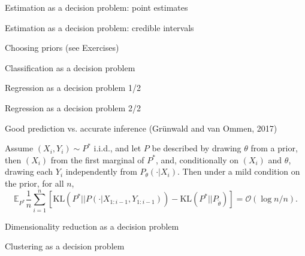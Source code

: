 \documentclass[10pt]{beamer}
\begin{document}
\begin{frame}{Estimation as a decision problem: point estimates}
\end{frame}

\begin{frame}{Estimation as a decision problem: credible intervals}
\end{frame}

\begin{frame}{Choosing priors (see Exercises)}
\end{frame}

\begin{frame}{Classification as a decision problem}
\end{frame}

\begin{frame}{Regression as a decision problem 1/2}
\end{frame}

\begin{frame}{Regression as a decision problem 2/2}
\end{frame}

\begin{frame}{Good prediction vs. accurate inference (Gr\"{u}nwald and van Ommen, 2017)}
\vspace{-1.5cm}
\begin{theorem}[Barron, 1997]
  Assume $(X_i,Y_i)\sim P^*$ i.i.d., and let $P$ be described by drawing $\theta$ from a prior, then $(X_i)$ from the first marginal of $P^*$, and, conditionally on $(X_i)$ and $\theta$, drawing each $Y_i$ independently from $P_\theta(\cdot\vert X_i)$.
  Then under a mild condition on the prior, for all $n$, 
  $$
    \mathbb{E}_{P^*} \frac1n \sum_{i=1}^n \left[ \mathrm{KL}(P^*\vert\vert P(\cdot\vert X_{1:i-1}, Y_{1:i-1})) - \mathrm{KL}(P^*\vert\vert P_{\tilde\theta}) \right] = \mathcal{O}(\log n/n).
  $$
\end{theorem}
  \vfill
\end{frame}

\begin{frame}{Dimensionality reduction as a decision problem}
\end{frame}

\begin{frame}{Clustering as a decision problem}
\end{frame}
\end{document}
